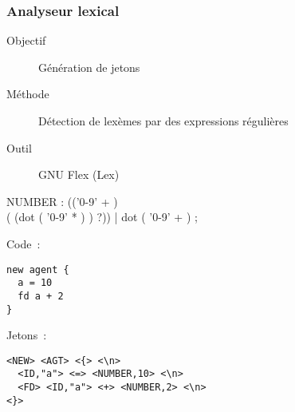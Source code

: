 \begin{frame}
	\frametitle{Analyseur lexical}
	\begin{description}
		\item [Objectif] Génération de jetons
		\item [Méthode] Détection de lexèmes par des expressions régulières
		\item [Outil] GNU Flex (Lex)
	\end{description}
\end{frame}

\begin{frame}[fragile]
	\begin{rail}
		NUMBER : (('0-9' + ) \\ ( (dot ( '0-9' * ) ) ?))
		| dot ( '0-9' + ) ;
	\end{rail}
\end{frame}

\begin{frame}[fragile]
	Code~:
	\begin{lstlisting}[language=Stibbons]
new agent {
  a = 10
  fd a + 2
}
	\end{lstlisting}
	Jetons~:
	\begin{lstlisting}[breaklines]
<NEW> <AGT> <{> <\n> 
  <ID,"a"> <=> <NUMBER,10> <\n>
  <FD> <ID,"a"> <+> <NUMBER,2> <\n>
<}>
	\end{lstlisting}
\end{frame}
